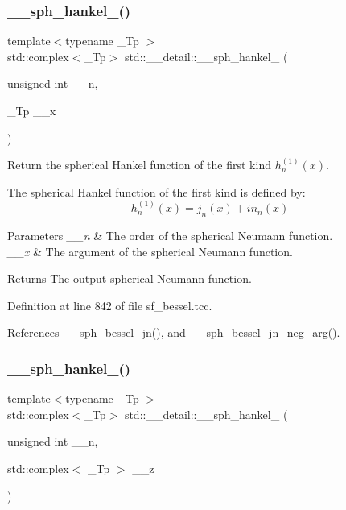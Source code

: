 \subsubsection{\texorpdfstring{\+\_\+\+\_\+sph\+\_\+hankel\+\_()}{\_\_sph\_hankel\_1()}\hspace{0.1cm}{\footnotesize\ttfamily [1/2]}}
{\footnotesize\ttfamily template$<$typename \+\_\+\+Tp $>$ \\
std\+::complex$<$\+\_\+\+Tp$>$ std\+::\+\_\+\+\_\+detail\+::\+\_\+\+\_\+sph\+\_\+hankel\+\_ (\begin{DoxyParamCaption}\item[{unsigned int}]{\+\_\+\+\_\+n,  }\item[{\+\_\+\+Tp}]{\+\_\+\+\_\+x }\end{DoxyParamCaption})}



Return the spherical Hankel function of the first kind $ h^{(1)}_n(x) $. 

The spherical Hankel function of the first kind is defined by\+: \[ h^{(1)}_n(x) = j_n(x) + i n_n(x) \]


\begin{DoxyParams}{Parameters}
{\em \+\_\+\+\_\+n} & The order of the spherical Neumann function. \\
\hline
{\em \+\_\+\+\_\+x} & The argument of the spherical Neumann function. \\
\hline
\end{DoxyParams}
\begin{DoxyReturn}{Returns}
The output spherical Neumann function. 
\end{DoxyReturn}


Definition at line 842 of file sf\+\_\+bessel.\+tcc.



References \+\_\+\+\_\+sph\+\_\+bessel\+\_\+jn(), and \+\_\+\+\_\+sph\+\_\+bessel\+\_\+jn\+\_\+neg\+\_\+arg().

\mbox{\label{namespacestd_1_1____detail_a887838c407a7cdb7c4ee145a18d2aa12}} 
\subsubsection{\texorpdfstring{\+\_\+\+\_\+sph\+\_\+hankel\+\_()}{\_\_sph\_hankel\_1()}\hspace{0.1cm}{\footnotesize\ttfamily [2/2]}}
{\footnotesize\ttfamily template$<$typename \+\_\+\+Tp $>$ \\
std\+::complex$<$\+\_\+\+Tp$>$ std\+::\+\_\+\+\_\+detail\+::\+\_\+\+\_\+sph\+\_\+hankel\+\_ (\begin{DoxyParamCaption}\item[{unsigned int}]{\+\_\+\+\_\+n,  }\item[{std\+::complex$<$ \+\_\+\+Tp $>$}]{\+\_\+\+\_\+z }\end{DoxyParamCaption})}



